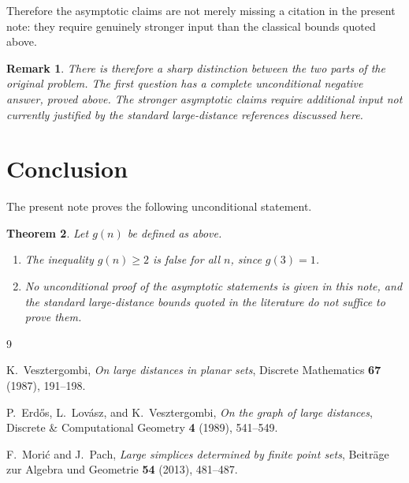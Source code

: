 \documentclass[12pt]{article}
\newtheorem{theorem}{Theorem}
\newtheorem{remark}[theorem]{Remark}
\begin{document}
Therefore the asymptotic claims are not merely missing a citation in the present note: they require genuinely stronger input than the classical bounds quoted above.

\begin{remark}
There is therefore a sharp distinction between the two parts of the original problem.
The first question has a complete unconditional negative answer, proved above.
The stronger asymptotic claims require additional input not currently justified by the standard large-distance references discussed here.
\end{remark}

\section{Conclusion}

The present note proves the following unconditional statement.

\begin{theorem}
Let $g(n)$ be defined as above.
\begin{enumerate}
\item The inequality $g(n) \ge 2$ is false for all $n$, since $g(3)=1$.
\item No unconditional proof of the asymptotic statements is given in this note, and the standard large-distance bounds quoted in the literature do not suffice to prove them.
\end{enumerate}
\end{theorem}

\begin{thebibliography}{9}

K.~Vesztergombi,
\emph{On large distances in planar sets},
Discrete Mathematics \textbf{67} (1987), 191--198.

P.~Erd\H{o}s, L.~Lov\'asz, and K.~Vesztergombi,
\emph{On the graph of large distances},
Discrete \& Computational Geometry \textbf{4} (1989), 541--549.

F.~Mori\'c and J.~Pach,
\emph{Large simplices determined by finite point sets},
Beitr\"age zur Algebra und Geometrie \textbf{54} (2013), 481--487.

\end{thebibliography}
\end{document}
